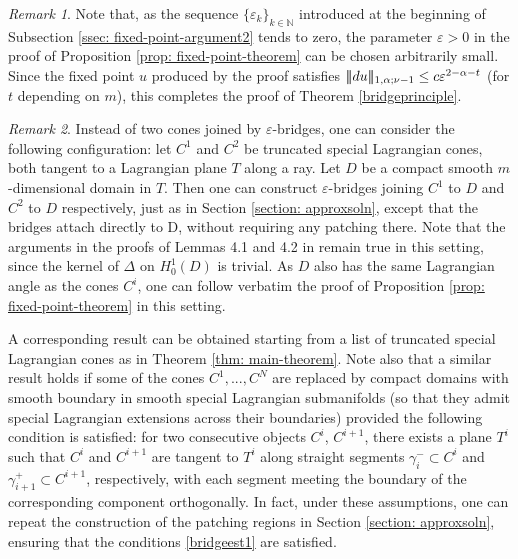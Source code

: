 \documentclass[11pt]{amsart}
\DeclarePairedDelimiter{\tnorm}{\vert\!\vert\!\vert}{\vert\!\vert\!\vert}
\theoremstyle{definition}
\theoremstyle{remark}
\newtheorem{remark}{Remark}
\begin{document}
\begin{remark}
    Note that, as the sequence $\{\varepsilon_k\}_{k\in \mathbb{N}}$ introduced at the beginning of Subsection \ref{ssec: fixed-point-argument2} tends to zero, the parameter
    $\varepsilon>0$ in the proof of Proposition \ref{prop: fixed-point-theorem} can be chosen arbitrarily small. Since the fixed point $u$ produced by the proof satisfies $\tnorm{du}_{1,\alpha;\nu-1}\leq c \varepsilon^{2-\alpha-t}$ (for $t$ depending on $m$), this completes the proof of Theorem \ref{bridgeprinciple}.
    \end{remark}
    \begin{remark}\label{rmk: more-general-examples}
        Instead of two cones joined by $\varepsilon$-bridges, one can consider the following configuration: let $C^1$ and $C^2$ be truncated special Lagrangian cones, both tangent to a Lagrangian plane $T$ along a ray. Let $D$ be a compact smooth $m$-dimensional domain in $T$. Then one can construct $\varepsilon$-bridges joining $C^1$ to $D$ and $C^2$ to $D$ respectively, just as in Section \ref{section: approxsoln}, except that the bridges attach directly to D, without requiring any patching there. Note that the arguments in the proofs of Lemmas 4.1 and 4.2 in \cite{Sm93} remain true in this setting, since the kernel of $\Delta$ on $H_0^1(D)$ is trivial. As $D$ also has the same Lagrangian angle as the cones $C^i$, one can follow verbatim the proof of Proposition \ref{prop: fixed-point-theorem} in this setting. 
        
        A corresponding result can be obtained starting from a list of truncated special Lagrangian cones as in Theorem \ref{thm: main-theorem}.
        Note also that a similar result holds if some of the cones $C^1,...,C^N$ are replaced by compact domains with smooth boundary in smooth special Lagrangian submanifolds (so that they admit special Lagrangian extensions across their boundaries) provided the following condition is satisfied: for two consecutive objects $C^i$, $C^{i+1}$, there exists a plane $T^i$ such that $C^{i}$ and $C^{i+1}$ are tangent to $T^i$ along straight segments $\gamma_i^-\subset C^i$ and $\gamma_{i+1}^+\subset C^{i+1}$, respectively, with each segment meeting the boundary of the corresponding component orthogonally. In fact, under these assumptions, one can repeat the construction of the patching regions in Section \ref{section: approxsoln}, ensuring that the conditions \eqref{bridgeest1} are satisfied.
    \end{remark}
        
\end{document}
